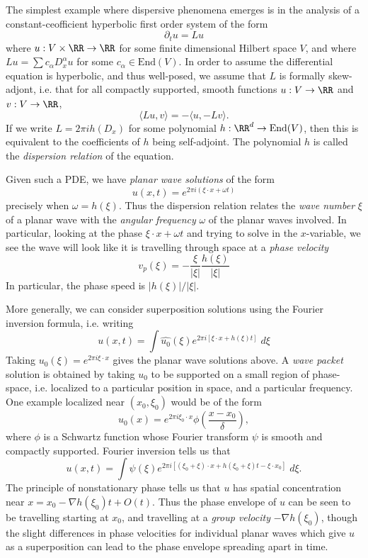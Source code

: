 The simplest example where dispersive phenomena emerges is in the analysis of a constant-ceofficient hyperbolic first order system of the form
%
\[ \partial_t u = Lu \]
%
where $u: V \times \RR \to \RR$ for some finite dimensional Hilbert space $V$, and where $Lu = \sum c_\alpha D_x^\alpha u$ for some $c_\alpha \in \text{End}(V)$. In order to assume the differential equation is hyperbolic, and thus well-posed, we assume that $L$ is formally skew-adjont, i.e. that for all compactly supported, smooth functions $u: V \to \RR$ and $v: V \to \RR$,
%
\[ \langle Lu, v \rangle = - \langle u, - Lv \rangle. \]
%
If we write $L = 2 \pi i h(D_x)$ for some polynomial $h: \RR^d \to \text{End}(V)$, then this is equivalent to the coefficients of $h$ being self-adjoint. The polynomial $h$ is called the \emph{dispersion relation} of the equation.

Given such a PDE, we have \emph{planar wave solutions} of the form
%
\[ u(x,t) = e^{2 \pi i (\xi \cdot x + \omega t)} \]
precisely when $\omega = h(\xi)$. Thus the dispersion relation relates the \emph{wave number} $\xi$ of a planar wave with the \emph{angular frequency} $\omega$ of the planar waves involved. In particular, looking at the phase $\xi \cdot x + \omega t$ and trying to solve in the $x$-variable, we see the wave will look like it is travelling through space at a \emph{phase velocity}
%
\[ v_p(\xi) = - \frac{\xi}{|\xi|} \frac{h(\xi)}{|\xi|} \]
%
In particular, the phase speed is $|h(\xi)| / |\xi|$.

More generally, we can consider superposition solutions using the Fourier inversion formula, i.e. writing
%
\[ u(x,t) = \int \widehat{u_0}(\xi) e^{2 \pi i [\xi \cdot x + h(\xi) t]}\; d\xi \]
%
Taking $u_0(\xi) = e^{2 \pi i \xi \cdot x}$ gives the planar wave solutions above. A \emph{wave packet} solution is obtained by taking $u_0$ to be supported on a small region of phase-space, i.e. localized to a particular position in space, and a particular frequency. One example localized near $(x_0,\xi_0)$ would be of the form
%
\[ u_0(x) = e^{2 \pi i \xi_0 \cdot x} \phi \left( \frac{x - x_0}{\delta} \right), \]
%
where $\phi$ is a Schwartz function whose Fourier transform $\psi$ is smooth and compactly supported. Fourier inversion tells us that
%
\[ u(x,t) = \int \psi(\xi) e^{2 \pi i [ (\xi_0 + \xi) \cdot x + h(\xi_0 + \xi) t - \xi \cdot x_0 ]}\; d\xi. \]
%
The principle of nonstationary phase tells us that $u$ has spatial concentration near $x = x_0 - \nabla h(\xi_0) t + O(t)$. Thus the phase envelope of $u$ can be seen to be travelling starting at $x_0$, and travelling at a \emph{group velocity} $- \nabla h(\xi_0)$, though the slight differences in phase velocities for individual planar waves which give $u$ as a superposition can lead to the phase envelope spreading apart in time.

